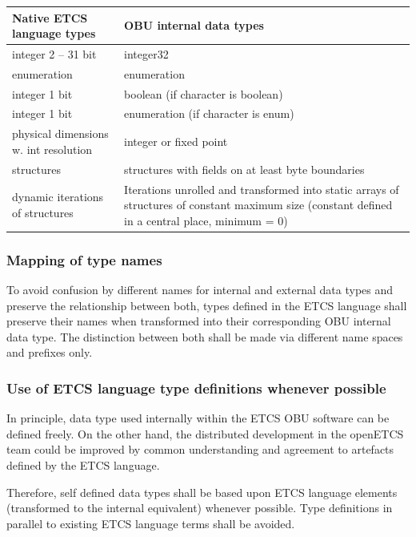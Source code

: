 		\begin{tabular}{|p{7cm} | p{7cm} |}
			\hline 
				Native ETCS language types & OBU internal data types \\
			\hline 
			integer 2 – 31 bit & integer32  \\
			\hline 
			enumeration & enumeration \\
			\hline 
			integer 1 bit & boolean (if character is boolean) \\
			\hline 
			integer 1 bit & enumeration (if character is enum) \\
			\hline 
			physical dimensions w. int resolution & integer or fixed point \\
			\hline 
			structures & structures with fields on at least byte boundaries \\
			\hline 
			dynamic iterations of structures & Iterations unrolled and transformed into static arrays of structures of constant maximum size (constant defined in a central place, minimum = 0) \\
			\hline 
			
		\end{tabular}

\subsubsection{Mapping of type names}

To avoid confusion by different names for internal and external data types and preserve the relationship between both, types defined in the ETCS language shall preserve their names when transformed into their corresponding OBU internal data type. The distinction between both shall be made via different name spaces and prefixes only. 

\subsubsection{Use of ETCS language type definitions whenever possible}

In principle, data type used internally within the ETCS OBU software can be defined freely. 
On the other hand, the distributed development in the openETCS team could be improved by common understanding and agreement to artefacts defined by the ETCS language.

Therefore, self defined data types shall be based upon ETCS language elements (transformed to the internal equivalent) whenever possible.
Type definitions in parallel to existing ETCS language terms shall be avoided. 

